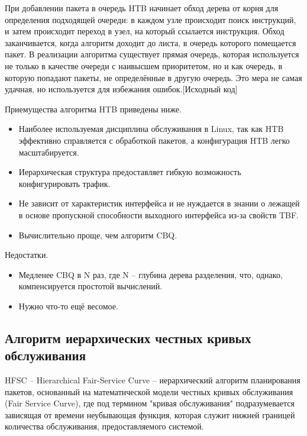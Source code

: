         При добавлении пакета в очередь HTB начинает обход дерева от корня
        для определения подходящей очереди: в каждом узле происходит поиск
        инструкций, и затем происходит переход в узел, на который ссылается
        инструкция. Обход заканчивается, когда алгоритм доходит до листа,
        в очередь которого помещается пакет.\cite{tchtb} В реализации алгоритма
		существует прямая очередь, которая используется не только в качестве
		очереди с наивысшем приоритетом, но и как очередь, в которую попадают
		пакеты, не определённые в другую очередь. Это мера не самая удачная,
		но используется для избежания ошибок.[Исходный код]

        Приемущества алгоритма HTB приведены ниже.
        \begin{itemize}
            \item Наиболее используемая дисциплина обслуживания в Linux, так как HTB эффективно
				  справляется с обработкой пакетов, а конфигурация HTB легко масштабируется.\cite{lartc}
            \item Иерархическая структура предоставляет гибкую возможность конфигурировать трафик.
            \item Не зависит от характеристик интерфейса и не нуждается в знании о лежащей в
                  основе пропускной способности выходного интерфейса из-за свойств TBF. \cite{tchtb}
            \item Вычислительно проще, чем алгоритм CBQ.\cite{htb}
        \end{itemize}

        Недостатки.
        \begin{itemize}
            \item Медленее CBQ в N раз, где N -- глубина дерева разделения, что, однако, компенсируется простотой вычислений.\cite{htb}
			\item Нужно что-то ещё весомое.
        \end{itemize}

    \subsection{Алгоритм иерархических честных кривых обслуживания}

        HFSC -- Hierarchical Fair-Service Curve -- иерархический алгоритм планирования пакетов,
        основанный на математической модели честных кривых обслуживания (Fair Service Curve),
        где под термином "кривая обслуживания" подразумевается зависящая от времени
        неубывающая функция, которая служит нижней границей количества обслуживания,
        предоставляемого системой.\cite{hfsc}

